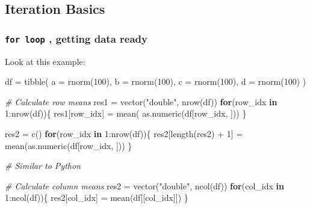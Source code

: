 \documentclass[
]{article}
\newenvironment{Shaded}{}{}
\newcommand{\AttributeTok}[1]{\textcolor[rgb]{0.49,0.56,0.16}{#1}}
\newcommand{\CommentTok}[1]{\textcolor[rgb]{0.38,0.63,0.69}{\textit{#1}}}
\newcommand{\ControlFlowTok}[1]{\textcolor[rgb]{0.00,0.44,0.13}{\textbf{#1}}}
\newcommand{\DecValTok}[1]{\textcolor[rgb]{0.25,0.63,0.44}{#1}}
\newcommand{\FunctionTok}[1]{\textcolor[rgb]{0.02,0.16,0.49}{#1}}
\newcommand{\NormalTok}[1]{#1}
\newcommand{\OtherTok}[1]{\textcolor[rgb]{0.00,0.44,0.13}{#1}}
\newcommand{\SpecialCharTok}[1]{\textcolor[rgb]{0.25,0.44,0.63}{#1}}
\newcommand{\StringTok}[1]{\textcolor[rgb]{0.25,0.44,0.63}{#1}}
\begin{document}
\hypertarget{iteration-basics}{%
\subsection{\texorpdfstring{Iteration Basics
}{Iteration Basics }}\label{iteration-basics}}

\hypertarget{for-loop--getting-data-ready}{%
\subsubsection{\texorpdfstring{\texttt{for\ loop} , getting data
ready}{for loop , getting data ready}}\label{for-loop--getting-data-ready}}

Look at this example:

\begin{Shaded}
\begin{Highlighting}[]
\NormalTok{df }\OtherTok{=}
	\FunctionTok{tibble}\NormalTok{( }
    \AttributeTok{a =} \FunctionTok{rnorm}\NormalTok{(}\DecValTok{100}\NormalTok{), }
    \AttributeTok{b =} \FunctionTok{rnorm}\NormalTok{(}\DecValTok{100}\NormalTok{), }
    \AttributeTok{c =} \FunctionTok{rnorm}\NormalTok{(}\DecValTok{100}\NormalTok{), }
    \AttributeTok{d =} \FunctionTok{rnorm}\NormalTok{(}\DecValTok{100}\NormalTok{)}
\NormalTok{  )}

\CommentTok{\# Calculate row means }
\NormalTok{res1 }\OtherTok{=}
	\FunctionTok{vector}\NormalTok{(}\StringTok{"double"}\NormalTok{, }\FunctionTok{nrow}\NormalTok{(df))}
\ControlFlowTok{for}\NormalTok{(row\_idx }\ControlFlowTok{in} \DecValTok{1}\SpecialCharTok{:}\FunctionTok{nrow}\NormalTok{(df))\{}
\NormalTok{  res1[row\_idx] }\OtherTok{=}
  	\FunctionTok{mean}\NormalTok{( }\FunctionTok{as.numeric}\NormalTok{(df[row\_idx, ]))}
\NormalTok{\}}

\NormalTok{res2 }\OtherTok{=} \FunctionTok{c}\NormalTok{()}
\ControlFlowTok{for}\NormalTok{(row\_idx }\ControlFlowTok{in} \DecValTok{1}\SpecialCharTok{:}\FunctionTok{nrow}\NormalTok{(df))\{}
\NormalTok{  res2[}\FunctionTok{length}\NormalTok{(res2) }\SpecialCharTok{+} \DecValTok{1}\NormalTok{] }\OtherTok{=}
  	\FunctionTok{mean}\NormalTok{(}\FunctionTok{as.numeric}\NormalTok{(df[row\_idx, ]))}
\NormalTok{\}}

\CommentTok{\# Similar to Python}

\CommentTok{\# Calculate column means }
\NormalTok{res2 }\OtherTok{=}
	\FunctionTok{vector}\NormalTok{(}\StringTok{"double"}\NormalTok{, }\FunctionTok{ncol}\NormalTok{(df))}
\ControlFlowTok{for}\NormalTok{(col\_idx }\ControlFlowTok{in} \DecValTok{1}\SpecialCharTok{:}\FunctionTok{ncol}\NormalTok{(df))\{}
\NormalTok{  res2[col\_idx] }\OtherTok{=}
  	\FunctionTok{mean}\NormalTok{(df[[col\_idx]])}
\NormalTok{\}}
\end{Highlighting}
\end{Shaded}
\end{document}
